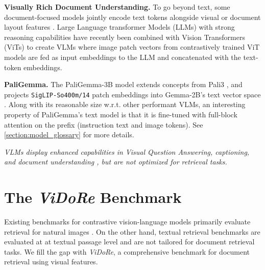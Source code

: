 \documentclass{article} %
\newcommand{\code}[1]{\texttt{#1}}
\begin{document}
\noindent\textbf{Visually Rich Document Understanding.}
To go beyond text, some document-focused models jointly encode text tokens alongside visual or document layout features \citep{appalaraju_docformer_2021, kim_ocr-free_2021, huang_layoutlmv3_2022, tang_unifying_2022}. 
Large Language transformer Models (LLMs) with strong reasoning capabilities have recently been combined with Vision Transformers (ViTs) \citep{dosovitskiy_image_2020} to create VLMs \citep{alayrac_flamingo_2022, liu_visual_2023, bai_qwen-vl_2023, laurencon_what_2024} where image patch vectors from contrastively trained ViT models \citep{zhai_sigmoid_2023} are fed as input embeddings to the LLM and concatenated with the text-token embeddings. 

\label{paragraph:generative_vision_language_model}
\noindent\textbf{PaliGemma.}
The PaliGemma-3B model \citep{beyer2024paligemmaversatile3bvlm} extends concepts from Pali3 \citep{chen_pali-3_2023}, and projects \code{SigLIP-So400m/14} \citep{alabdulmohsin_getting_2023} patch embeddings into Gemma-2B's text vector space \citep{gemma_team_gemma_2024}. Along with its reasonable size w.r.t. other performant VLMs, an interesting property of PaliGemma's text model is that it is fine-tuned with full-block attention on the prefix (instruction text and image tokens). See \autoref{section:model_glossary} for more details.

\noindent\textit{VLMs display enhanced capabilities in Visual Question Answering, captioning, and document understanding \citep{yue_mmmu_2023}, but are not optimized for retrieval tasks.}



\section{The \textit{ViDoRe} Benchmark}
\label{section:docvis_benchmark}

Existing benchmarks for contrastive vision-language models primarily evaluate retrieval for natural images \citep{lin_microsoft_2014,borchmann_due_2021,thapliyal_crossmodal-3600_2022}. On the other hand, textual retrieval benchmarks \citep{muennighoff_mteb_2022} are evaluated at at textual passage level and are not tailored for document retrieval tasks. We fill the gap with \textit{ViDoRe}, a comprehensive benchmark for document retrieval using visual features. 
\end{document}
